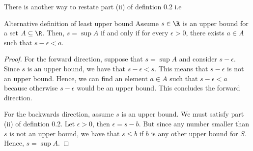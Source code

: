 There is another way to restate part (ii) of defintion 0.2 i.e 

\begin{lemma}{Alternative definition of least upper bound}{}
Assume \( s \in \R \) is an upper bound for a set \( A \subseteq \R \). Then, \( s = \sup A \) if and only if for every \( \epsilon > 0 \), there exists \( a \in A \) such that \( s - \epsilon < a \).
\end{lemma}

\begin{proof}
For the forward direction, suppose that \( s = \sup A \) and consider \( s - \epsilon \). Since \( s \) is an upper bound, we have that \( s -\epsilon < s \). This means that \( s - \epsilon \) is not an upper bound. Hence, we can find an element \( a \in A \) such that \( s - \epsilon < a \) because otherwise \( s - \epsilon \) would be an upper bound. This concludes the forward direction.

For the backwards direction, assume \( s \) is an upper bound. We must satisfy part (ii) of defintion 0.2. Let \( \epsilon > 0 \), then \( \epsilon = s - b \). But since any number smaller than \( s \) is not an upper bound, we have that \( s \leq b \) if \( b \) is any other upper bound for \( S \).
Hence, \( s = \sup A \). 
\end{proof}




